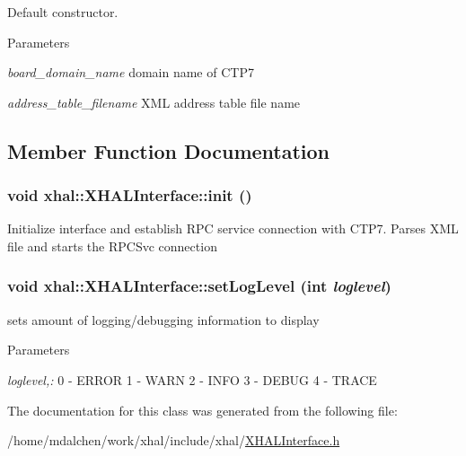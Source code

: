 Default constructor. 
\begin{DoxyParams}{Parameters}
\item[{\em board\_\-domain\_\-name}]domain name of CTP7 \item[{\em address\_\-table\_\-filename}]XML address table file name \end{DoxyParams}


\subsection{Member Function Documentation}
\hypertarget{classxhal_1_1XHALInterface_a37d127d6a407b73b9746de85d2bf5232}{
\subsubsection[{init}]{\setlength{\rightskip}{0pt plus 5cm}void xhal::XHALInterface::init ()}}
\label{classxhal_1_1XHALInterface_a37d127d6a407b73b9746de85d2bf5232}


Initialize interface and establish RPC service connection with CTP7. Parses XML file and starts the RPCSvc connection \hypertarget{classxhal_1_1XHALInterface_af04487e30a68e8d479d8ae2ad7d0fc81}{
\subsubsection[{setLogLevel}]{\setlength{\rightskip}{0pt plus 5cm}void xhal::XHALInterface::setLogLevel (int {\em loglevel})}}
\label{classxhal_1_1XHALInterface_af04487e30a68e8d479d8ae2ad7d0fc81}


sets amount of logging/debugging information to display 
\begin{DoxyParams}{Parameters}
\item[{\em loglevel,:}]0 -\/ ERROR 1 -\/ WARN 2 -\/ INFO 3 -\/ DEBUG 4 -\/ TRACE \end{DoxyParams}


The documentation for this class was generated from the following file:\begin{DoxyCompactItemize}
\item 
/home/mdalchen/work/xhal/include/xhal/\hyperlink{XHALInterface_8h}{XHALInterface.h}\end{DoxyCompactItemize}
